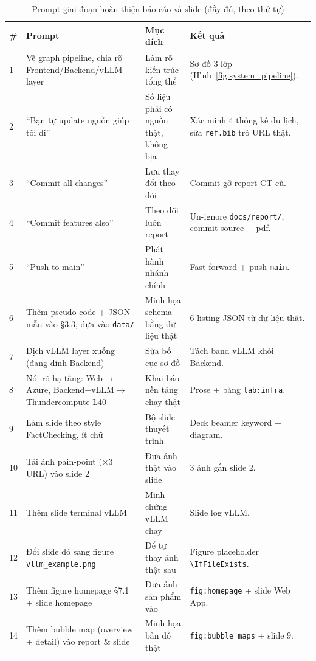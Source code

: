 \begin{table}[H]
\centering
\caption{Prompt giai đoạn hoàn thiện báo cáo và slide (đầy đủ, theo thứ tự)}
\label{tab:prompts_report}
\footnotesize
\begin{tabularx}{\textwidth}{@{}p{0.4cm} >{\raggedright\arraybackslash}p{4.2cm} >{\raggedright\arraybackslash}p{3.3cm} X@{}}
\toprule
\textbf{\#} & \textbf{Prompt} & \textbf{Mục đích} & \textbf{Kết quả} \\
\midrule
1 & Vẽ graph pipeline, chia rõ Frontend/Backend/vLLM layer & Làm rõ kiến trúc tổng thể & Sơ đồ 3 lớp (Hình~\ref{fig:system_pipeline}). \\
2 & ``Bạn tự update nguồn giúp tôi đi'' & Số liệu phải có nguồn thật, không bịa & Xác minh 4 thống kê du lịch, sửa \texttt{ref.bib} trỏ URL thật. \\
3 & ``Commit all changes'' & Lưu thay đổi theo dõi & Commit gỡ report CT cũ. \\
4 & ``Commit features also'' & Theo dõi luôn report & Un-ignore \texttt{docs/report/}, commit source + pdf. \\
5 & ``Push to main'' & Phát hành nhánh chính & Fast-forward + push \texttt{main}. \\
6 & Thêm pseudo-code + JSON mẫu vào §3.3, dựa vào \texttt{data/} & Minh họa schema bằng dữ liệu thật & 6 listing JSON từ dữ liệu thật. \\
7 & Dịch vLLM layer xuống (đang dính Backend) & Sửa bố cục sơ đồ & Tách band vLLM khỏi Backend. \\
8 & Nói rõ hạ tầng: Web$\to$Azure, Backend+vLLM$\to$Thundercompute L40 & Khai báo nền tảng chạy thật & Prose + bảng \texttt{tab:infra}. \\
9 & Làm slide theo style FactChecking, ít chữ & Bộ slide thuyết trình & Deck beamer keyword + diagram. \\
10 & Tải ảnh pain-point (×3 URL) vào slide 2 & Đưa ảnh thật vào slide & 3 ảnh gắn slide 2. \\
11 & Thêm slide terminal vLLM & Minh chứng vLLM chạy & Slide log vLLM. \\
12 & Đổi slide đó sang figure \texttt{vllm\_example.png} & Để tự thay ảnh thật sau & Figure placeholder \texttt{\textbackslash IfFileExists}. \\
13 & Thêm figure homepage §7.1 + slide homepage & Đưa ảnh sản phẩm vào & \texttt{fig:homepage} + slide Web App. \\
14 & Thêm bubble map (overview + detail) vào report \& slide & Minh họa bản đồ thật & \texttt{fig:bubble\_maps} + slide 9. \\

\end{tabularx}
\end{table}
